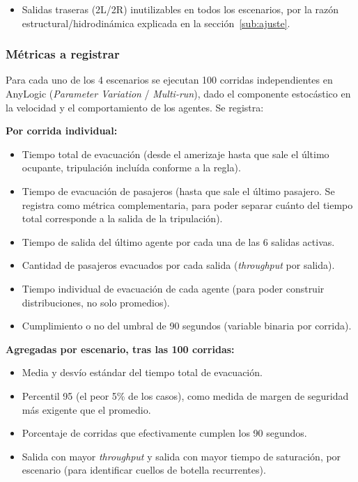 \documentclass[a4paper, 11pt]{article}
\begin{document}
\begin{itemize}[leftmargin=2em]
    \item Salidas traseras (2L/2R) inutilizables en todos los escenarios, por la
          raz\'on estructural/hidrodin\'amica explicada en la secci\'on~\ref{sub:ajuste}.
\end{itemize}

\subsubsection{M\'etricas a registrar}\label{sub:metricas}

Para cada uno de los 4 escenarios se ejecutan 100 corridas independientes en
AnyLogic (\textit{Parameter Variation} / \textit{Multi-run}), dado el componente
estoc\'astico en la velocidad y el comportamiento de los agentes. Se registra:

\textbf{Por corrida individual:}
\begin{itemize}[leftmargin=2em]
    \item Tiempo total de evacuaci\'on (desde el amerizaje hasta que sale el
          \'ultimo ocupante, tripulaci\'on inclu\'ida conforme a la regla).
    \item Tiempo de evacuaci\'on de pasajeros (hasta que sale el \'ultimo pasajero.
          Se registra como m\'etrica complementaria, para poder separar cu\'anto del
          tiempo total corresponde a la salida de la tripulaci\'on).
    \item Tiempo de salida del \'ultimo agente por cada una de las 6 salidas activas.
    \item Cantidad de pasajeros evacuados por cada salida (\textit{throughput} por
          salida).
    \item Tiempo individual de evacuaci\'on de cada agente (para poder construir
          distribuciones, no solo promedios).
    \item Cumplimiento o no del umbral de 90 segundos (variable binaria por corrida).
\end{itemize}

\textbf{Agregadas por escenario, tras las 100 corridas:}
\begin{itemize}[leftmargin=2em]
    \item Media y desv\'io est\'andar del tiempo total de evacuaci\'on.
    \item Percentil 95 (el peor 5\% de los casos), como medida de margen de seguridad
          m\'as exigente que el promedio.
    \item Porcentaje de corridas que efectivamente cumplen los 90 segundos.
    \item Salida con mayor \textit{throughput} y salida con mayor tiempo de
          saturaci\'on, por escenario (para identificar cuellos de botella
          recurrentes).
\end{itemize}
\end{document}
